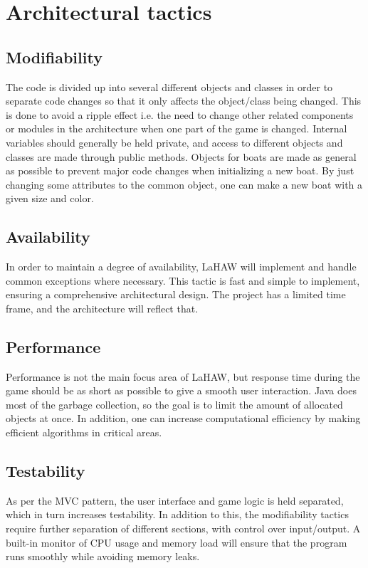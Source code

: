 \chapter{Architectural tactics}

    \section{Modifiability}
    The code is divided up into several different objects and classes in order to separate code changes so that it only affects the object/class being changed. This is done to avoid a ripple effect i.e. the need to change other related components or modules in the architecture when one part of the game is changed. Internal variables should generally be held private, and access to different objects and classes are made through public methods. Objects for boats are made as general as possible to prevent major code changes when initializing a new boat. By just changing some attributes to the common object, one can make a new boat with a given size and color. 
    
    \section{Availability}
    \label{avail}
    In order to maintain a degree of availability, LaHAW will implement and handle common exceptions where necessary. This tactic is fast and simple to implement, ensuring a comprehensive architectural design. The project has a limited time frame, and the architecture will reflect that.
    
    \section{Performance}
    Performance is not the main focus area of LaHAW, but response time during the game should be as short as possible to give a smooth user interaction. Java does most of the garbage collection, so the goal is to limit the amount of allocated objects at once. In addition, one can increase computational efficiency by making efficient algorithms in critical areas. 
    
    \section{Testability}
    \label{test}
    As per the MVC pattern, the user interface and game logic is held separated, which in turn increases testability. In addition to this, the modifiability tactics require further separation of different sections, with control over input/output. A built-in monitor of CPU usage and memory load will ensure that the program runs smoothly while avoiding memory leaks.
    
